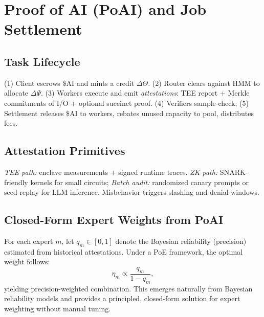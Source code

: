 \section{Proof of AI (PoAI) and Job Settlement}
\subsection{Task Lifecycle}
(1) Client escrows \$AI and mints a credit \(\Delta\Theta\). (2) Router clears against HMM to allocate \(\Delta\Psi\). (3) Workers execute and emit \emph{attestations}: TEE report + Merkle commitments of I/O + optional succinct proof. (4) Verifiers sample-check; (5) Settlement releases \$AI to workers, rebates unused capacity to pool, distributes fees.

\subsection{Attestation Primitives}
\emph{TEE path:} enclave measurements + signed runtime traces. \emph{ZK path:} SNARK-friendly kernels for small circuits; \emph{Batch audit:} randomized canary prompts or seed-replay for LLM inference. Misbehavior triggers slashing and denial windows.

\subsection{Closed-Form Expert Weights from PoAI}
For each expert \(m\), let \(q_m \in [0,1]\) denote the Bayesian reliability (precision) estimated from historical attestations. Under a PoE framework, the optimal weight follows:
\begin{equation}\label{eq:poai-weights}
\eta_m \propto \frac{q_m}{1-q_m},
\end{equation}
yielding precision-weighted combination. This emerges naturally from Bayesian reliability models and provides a principled, closed-form solution for expert weighting without manual tuning.
